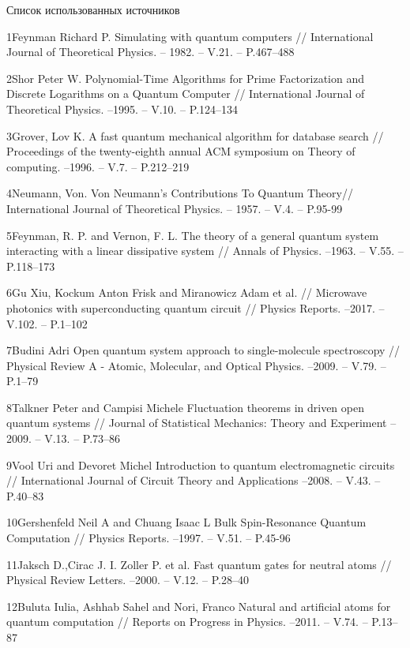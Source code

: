 \begin{center}
		\large Список использованных источников
\end{center}
	
	1\quad Feynman Richard P. Simulating with quantum computers // International Journal of Theoretical Physics. -- 1982. -- V.21. -- P.467--488
	
	2\quad Shor Peter W. Polynomial-Time Algorithms for Prime Factorization and Discrete Logarithms on a Quantum Computer // International Journal of Theoretical Physics. --1995. -- V.10. -- P.124--134
	
	3\quad Grover, Lov K. A fast quantum mechanical algorithm for database search // Proceedings of the twenty-eighth annual ACM symposium on Theory of computing. --1996. -- V.7. -- P.212--219
	
	4\quad Neumann, Von. Von Neumann's Contributions To Quantum Theory// International Journal of Theoretical Physics. -- 1957. -- V.4. -- P.95-99
	
	5\quad Feynman, R. P. and Vernon, F. L. The theory of a general quantum system interacting with a linear dissipative system // Annals of Physics. --1963. -- V.55. -- P.118--173
	
	6\quad Gu Xiu,  Kockum Anton Frisk and Miranowicz Adam et al. // Microwave photonics with superconducting quantum circuit // Physics Reports. --2017. -- V.102. -- P.1--102
	
	7\quad Budini Adri Open quantum system approach to single-molecule spectroscopy // Physical Review A - Atomic, Molecular, and Optical Physics. --2009. -- V.79. -- P.1--79
	
	8\quad Talkner Peter and Campisi Michele  Fluctuation theorems in driven open quantum systems // Journal of Statistical Mechanics: Theory and Experiment --2009. -- V.13. -- P.73--86
	
	9\quad Vool Uri and Devoret Michel Introduction to quantum electromagnetic circuits // International Journal of Circuit Theory and Applications --2008. -- V.43. -- P.40--83
	
	10\quad Gershenfeld Neil A and Chuang Isaac L Bulk Spin-Resonance Quantum Computation // Physics Reports. --1997. -- V.51. -- P.45-96
	
	11\quad Jaksch D.,Cirac J. I.  Zoller P. et al. Fast quantum gates for neutral atoms // Physical Review Letters. --2000. -- V.12. -- P.28--40
	
	12\quad Buluta Iulia, Ashhab Sahel and Nori, Franco Natural and artificial atoms for quantum computation // Reports on Progress in Physics. --2011. -- V.74. -- P.13--87
	

